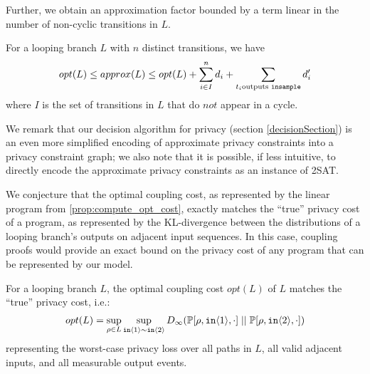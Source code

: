 Further, we obtain an approximation factor bounded by a term linear in the number of non-cyclic transitions in $L$. 

\begin{prop}
    \label{prop:approx_opt_are_close}
    For a looping branch $L$ with $n$ distinct transitions, we have 
    \[opt(L) \leq approx(L) \leq opt(L) + \sum_{i \in I }^n d_i + \sum_{t_i \text{outputs \texttt{insample}}} d_i'\]
    where $I$ is the set of transitions in $L$ that do $\textit{not}$ appear in a cycle.
\end{prop}

We remark that our decision algorithm for privacy (section \ref{decisionSection}) is an even more simplified encoding of approximate privacy constraints into a privacy constraint graph; we also note that it is possible, if less intuitive, to directly encode the approximate privacy constraints as an instance of 2SAT. 

We conjecture that the optimal coupling cost, as represented by the linear program from \ref{prop:compute_opt_cost}, exactly matches the ``true'' privacy cost of a program, as represented by the KL-divergence between the distributions of a looping branch's outputs on adjacent input sequences. In this case, coupling proofs would provide an exact bound on the privacy cost of any program that can be represented by our model. 

\begin{conj}
    For a looping branch $L$, the optimal coupling cost $opt(L)$ of $L$ matches the ``true'' privacy cost, i.e.:
    \begin{align*}
        opt(L) = \sup_{\rho \in L} \sup_{\texttt{in}\langle1 \rangle \sim \texttt{in}\langle2 \rangle} D_\infty(\mathbb{P}[\rho, \texttt{in}\langle1 \rangle, \cdot]\; ||\; \mathbb{P}[\rho, \texttt{in}\langle2 \rangle, \cdot])
    \end{align*}
    representing the worst-case privacy loss over all paths in $L$, all valid adjacent inputs, and all measurable output events.
\end{conj}
